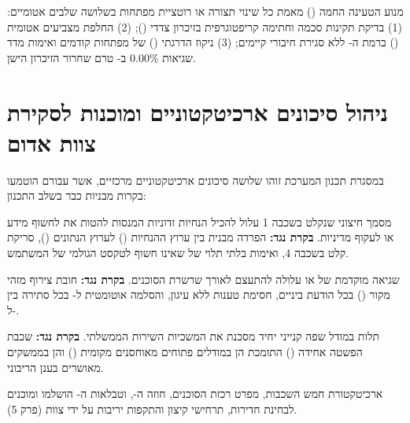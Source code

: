 \begin{insightbox}
מנוע הטעינה החמה () מאמת כל שינוי תצורה או רוטציית מפתחות בשלושה שלבים אטומיים:
(1) בדיקת תקינות סכמה וחתימה קריפטוגרפית בזיכרון צדדי ();
(2) החלפת מצביעים אטומית () ברמת ה- ללא סגירת חיבורי  קיימים;
(3) ניקוז הדרגתי () של מפתחות קודמים ואימות מדד שגיאות $0.00\%$ ב- טרם שחרור הזיכרון הישן.
\end{insightbox}

\section{ניהול סיכונים ארכיטקטוניים ומוכנות לסקירת צוות אדום}
\label{sec:arch-risks}

במסגרת תכנון המערכת זוהו שלושה סיכונים ארכיטקטוניים מרכזיים, אשר עבורם הוטמעו בקרות מבניות כבר בשלב התכנון:

\begin{riskbox}
מסמך חיצוני שנקלט בשכבה 1 עלול להכיל הנחיות זדוניות המנסות להטות את  לחשוף מידע או לעקוף מדיניות.
\textbf{בקרת נגד:} הפרדה מבנית בין ערוץ ההנחיות () לערוץ הנתונים (), סריקת קלט בשכבה 4, ואימות בלתי תלוי של  שאינו חשוף לטקסט הגולמי של המשתמש.
\end{riskbox}

\begin{riskbox}
שגיאה מוקדמת של  או  עלולה להתעצם לאורך שרשרת הסוכנים.
\textbf{בקרת נגד:} חובת צירוף מזהי מקור () בכל הודעת ביניים, חסימת טענות ללא עיגון, והסלמה אוטומטית ל- בכל סתירה בין  ל-.
\end{riskbox}

\begin{riskbox}
תלות במודל שפה קנייני יחיד מסכנת את המשכיות השירות הממשלתי.
\textbf{בקרת נגד:} שכבת הפשטה אחידה () התומכת הן במודלים פתוחים מאוחסנים מקומית () והן בממשקים מאושרים בענן הריבוני.
\end{riskbox}

\begin{insightbox}
ארכיטקטורת חמש השכבות, מפרט רכזת הסוכנים, חוזה ה-, וטבלאות ה- הושלמו ומוכנים לבחינת חדירות, תרחישי קיצון והתקפות יריבות על ידי צוות  (פרק 5).
\end{insightbox}
